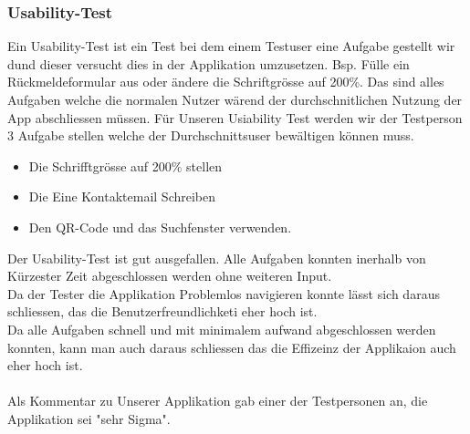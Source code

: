 \documentclass[10pt]{article}
\newcounter{subsubsubsection}[subsubsection]
\begin{document}
	\subsubsection{Usability-Test}
	Ein Usability-Test ist ein Test bei dem einem Testuser eine Aufgabe gestellt wir dund dieser versucht dies in der Applikation umzusetzen. Bsp. Fülle ein Rückmeldeformular aus oder ändere die Schriftgrösse auf 200\%. Das sind alles Aufgaben welche die normalen Nutzer wärend der durchschnitlichen Nutzung der App abschliessen müssen.
	Für Unseren Usiability Test werden wir der Testperson 3 Aufgabe stellen welche der Durchschnittsuser bewältigen können muss.
	\begin{itemize}
		\item Die Schrifftgrösse auf 200\% stellen
		\item Die Eine Kontaktemail Schreiben
		\item Den QR-Code und das Suchfenster verwenden.
	\end{itemize}
	Der Usability-Test ist gut ausgefallen. Alle Aufgaben konnten inerhalb von Kürzester Zeit abgeschlossen werden ohne weiteren Input.\\
	Da der Tester die Applikation Problemlos navigieren konnte lässt sich daraus schliessen, das die Benutzerfreundlichketi eher hoch ist.\\
	Da alle Aufgaben schnell und mit minimalem aufwand abgeschlossen werden konnten, kann man auch daraus schliessen das die Effizeinz der Applikaion auch eher hoch ist.
	\\\\
	Als Kommentar zu Unserer Applikation gab einer der Testpersonen an, die Applikation sei "sehr Sigma".
\end{document}
